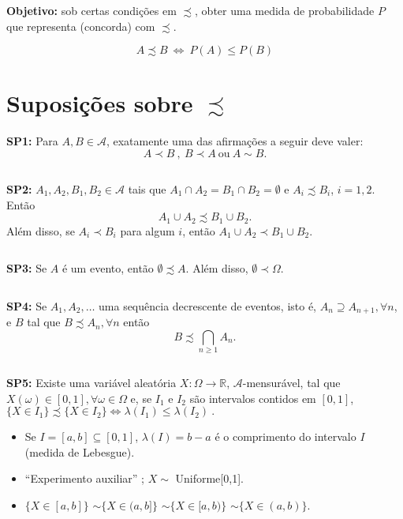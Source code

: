 \documentclass[
]{book}
\begin{document}
\textbf{Objetivo:} sob certas condições em \(\precsim\), obter uma medida de probabilidade \(P\) que representa (concorda) com \(\precsim\).

\[A \precsim B ~ \Longleftrightarrow ~ P(A) \leq P(B)\]

\hypertarget{suposiuxe7uxf5es-sobre-precsim}{%
\section{\texorpdfstring{Suposições sobre \(\precsim\)}{Suposições sobre \textbackslash precsim}}\label{suposiuxe7uxf5es-sobre-precsim}}

\textbf{SP1:} Para \(A, B \in \mathcal{A}\), exatamente uma das afirmações a seguir deve valer:\\
\[A \prec B ~,~ B \prec A ~\textrm{ou}~ A \sim B.\]

\(~\)

\textbf{SP2:} \(A_1, A_2, B_1, B_2 \in \mathcal{A}\) tais que \(A_1 \cap A_2 = B_1 \cap B_2 = \emptyset\) e \(A_i \precsim B_i\), \(i=1,2\). Então
\[A_1 \cup A_2 \precsim B_1 \cup B_2 .\]
Além disso, se \(A_i \prec B_i\) para algum \(i\), então \(A_1 \cup A_2 \prec B_1 \cup B_2 .\)

\(~\)

\textbf{SP3:} Se \(A\) é um evento, então \(\emptyset \precsim A\). Além disso, \(\emptyset \prec \Omega\).

\(~\)

\textbf{SP4:} Se \(A_1, A_2, \ldots\) uma sequência decrescente de eventos, isto é, \(A_n \supseteq A_{n+1}, \forall n\), e \(B\) tal que \(B \precsim A_n, \forall n\) então \[B \precsim \bigcap_{n \geq 1} A_n.\]

\(~\)

\textbf{SP5:} Existe uma variável aleatória \(X: \Omega \longrightarrow \mathbb{R}\), \(\mathcal{A}\)-mensurável, tal que \(X(\omega) \in [0,1], \forall \omega \in \Omega\) e, se \(I_1\) e \(I_2\) são intervalos contidos em \([0,1]\), \(\{X \in I_1\} \precsim \{X \in I_2\} \Leftrightarrow \lambda(I_1) \leq \lambda(I_2)~.\)

\begin{itemize}
\item
  Se \(I=[a,b] \subseteq [0,1]\), \(\lambda(I) = b-a\) é o comprimento do intervalo \(I\) (medida de Lebesgue).
\item
  ``Experimento auxiliar'' ; \(X \sim\) Uniforme{[}0,1{]}.
\item
  \(\{X \in [a,b]\}\) \(\sim \{X \in (a,b]\}\) \(\sim \{X \in [a,b)\}\) \(\sim \{X \in (a,b)\}\).
\end{itemize}
\end{document}
